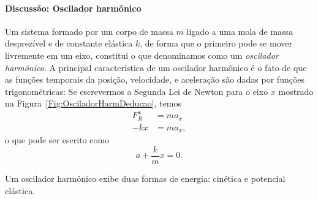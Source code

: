 

\paragraph{Discussão: Oscilador harmônico}

Um sistema formado por um corpo de massa $m$ ligado a uma mola de massa desprezível e de constante elástica $k$, de forma que o primeiro pode se mover livremente em um eixo, constitui o que denominamos como um \emph{oscilador harmônico}. A principal característica de um oscilador harmônico é o fato de que as funções temporais da posição, velocidade, e aceleração são dadas por funções trigonométricas: Se escrevermos a Segunda Lei de Newton para o eixo $x$ mostrado na Figura~\ref{Fig:OsciladorHarmDeducao}, temos
\begin{align}
    F_R^x &= m a_x \\
    -k x &= m a_x,
\end{align}
%
o que pode ser escrito como
\begin{equation}
    a + \frac{k}{m} x = 0.
\end{equation}

\begin{marginfigure}
\centering
{}
\caption{Um oscilador harmônico exibe duas formas de energia: cinética e potencial elástica. \label{Fig:OsciladorHarmDeducao}}
\end{marginfigure}

